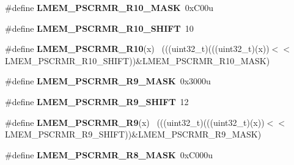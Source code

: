 \begin{DoxyCompactItemize}
\item 
\hypertarget{group___l_m_e_m___register___masks_gadefbfe064df891920d2f422a020bc6a9}{}\#define {\bfseries L\+M\+E\+M\+\_\+\+P\+S\+C\+R\+M\+R\+\_\+\+R10\+\_\+\+M\+A\+S\+K}~0x\+C00u\label{group___l_m_e_m___register___masks_gadefbfe064df891920d2f422a020bc6a9}

\item 
\hypertarget{group___l_m_e_m___register___masks_ga1da815cd77993e3ac3c15b66acbc7bb9}{}\#define {\bfseries L\+M\+E\+M\+\_\+\+P\+S\+C\+R\+M\+R\+\_\+\+R10\+\_\+\+S\+H\+I\+F\+T}~10\label{group___l_m_e_m___register___masks_ga1da815cd77993e3ac3c15b66acbc7bb9}

\item 
\hypertarget{group___l_m_e_m___register___masks_ga7c3c2afc773e468ba01cbdc02400f562}{}\#define {\bfseries L\+M\+E\+M\+\_\+\+P\+S\+C\+R\+M\+R\+\_\+\+R10}(x)                                          ~(((uint32\+\_\+t)(((uint32\+\_\+t)(x))$<$$<$L\+M\+E\+M\+\_\+\+P\+S\+C\+R\+M\+R\+\_\+\+R10\+\_\+\+S\+H\+I\+F\+T))\&L\+M\+E\+M\+\_\+\+P\+S\+C\+R\+M\+R\+\_\+\+R10\+\_\+\+M\+A\+S\+K)\label{group___l_m_e_m___register___masks_ga7c3c2afc773e468ba01cbdc02400f562}

\item 
\hypertarget{group___l_m_e_m___register___masks_gaa8942076e4d4199fcbd37eb77c03d731}{}\#define {\bfseries L\+M\+E\+M\+\_\+\+P\+S\+C\+R\+M\+R\+\_\+\+R9\+\_\+\+M\+A\+S\+K}~0x3000u\label{group___l_m_e_m___register___masks_gaa8942076e4d4199fcbd37eb77c03d731}

\item 
\hypertarget{group___l_m_e_m___register___masks_ga3a51ba2677e16743238ab23dd2178dbf}{}\#define {\bfseries L\+M\+E\+M\+\_\+\+P\+S\+C\+R\+M\+R\+\_\+\+R9\+\_\+\+S\+H\+I\+F\+T}~12\label{group___l_m_e_m___register___masks_ga3a51ba2677e16743238ab23dd2178dbf}

\item 
\hypertarget{group___l_m_e_m___register___masks_gad67534a73558c9e8ae1e8453fe068852}{}\#define {\bfseries L\+M\+E\+M\+\_\+\+P\+S\+C\+R\+M\+R\+\_\+\+R9}(x)                                            ~(((uint32\+\_\+t)(((uint32\+\_\+t)(x))$<$$<$L\+M\+E\+M\+\_\+\+P\+S\+C\+R\+M\+R\+\_\+\+R9\+\_\+\+S\+H\+I\+F\+T))\&L\+M\+E\+M\+\_\+\+P\+S\+C\+R\+M\+R\+\_\+\+R9\+\_\+\+M\+A\+S\+K)\label{group___l_m_e_m___register___masks_gad67534a73558c9e8ae1e8453fe068852}

\item 
\hypertarget{group___l_m_e_m___register___masks_ga9f265a1f3b3b26d0cb3139fbe6aa7aed}{}\#define {\bfseries L\+M\+E\+M\+\_\+\+P\+S\+C\+R\+M\+R\+\_\+\+R8\+\_\+\+M\+A\+S\+K}~0x\+C000u\label{group___l_m_e_m___register___masks_ga9f265a1f3b3b26d0cb3139fbe6aa7aed}


\end{DoxyCompactItemize}
